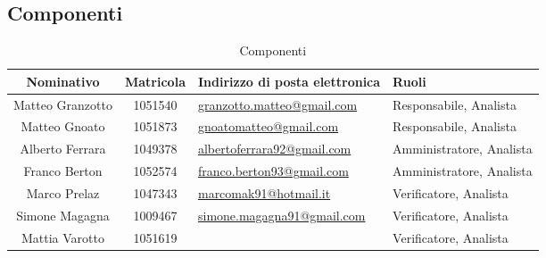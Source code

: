 \subsection{Componenti}
\begin{table}[H]
	\begin{center}
		\setlength{\extrarowheight}{\jot}
		\begin{tabular}{|c|c|p{5cm}|p{4.3cm}|}
			\hline
			\textbf{Nominativo} & \textbf{Matricola} & \raggedright \textbf{Indirizzo di posta elettronica} & \textbf{Ruoli} \\[1ex]
			\hline
	 		Matteo Granzotto	& 1051540	& \href{mailto:granzotto.matteo@gmail.com}{granzotto.matteo@gmail.com} 	& Responsabile, Analista 	\\[1ex]
			\hline
			Matteo Gnoato		& 1051873	& \href{mailto:gnoatomatteo@gmail.com}{gnoatomatteo@gmail.com} 			& Responsabile, Analista 	\\[1ex]
			\hline
			Alberto Ferrara		& 1049378	& \href{mailto:albertoferrara92@gmail.com}{albertoferrara92@gmail.com} 	& Amministratore, Analista 	\\[1ex]
			\hline
			Franco Berton 		& 1052574	& \href{mailto:franco.berton93@gmail.com}{franco.berton93@gmail.com} 	& Amministratore, Analista	\\[1ex]
			\hline
			Marco Prelaz		& 1047343	& \href{mailto:marcomak91@hotmail.it}{marcomak91@hotmail.it} 			& Verificatore, Analista	\\[1ex]
			\hline
			Simone Magagna		& 1009467	& \href{mailto:simone.magagna91@gmail.com}{simone.magagna91@gmail.com} 	& Verificatore, Analista 	\\[1ex]
			\hline
			Mattia Varotto		& 1051619	& \href{mailto:}{} & Verificatore, Analista \\[1ex]
			\hline	
		\end{tabular}
	\end{center}
	\caption{Componenti}
\end{table}


